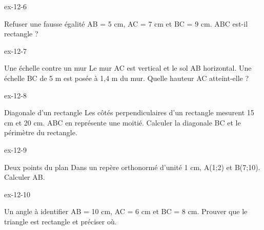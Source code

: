 \clearpage{}
\begin{blocLivre}{ex-12-6}\begin{exercice}[2]{Refuser une fausse égalité}
AB = 5 cm, AC = 7 cm et BC = 9 cm. ABC est-il rectangle ?
\label{fig-ex-12-6}
\end{exercice}\end{blocLivre}
\begin{blocLivre}{ex-12-7}\begin{exercice}[2]{Une échelle contre un mur}
Le mur AC est vertical et le sol AB horizontal. Une échelle BC de 5 m est posée à 1,4 m du mur. Quelle hauteur AC atteint-elle ?
\label{fig-ex-12-7}
\end{exercice}\end{blocLivre}
\begin{blocLivre}{ex-12-8}\begin{exercice}[2]{Diagonale d’un rectangle}
Les côtés perpendiculaires d’un rectangle mesurent 15 cm et 20 cm. ABC en représente une moitié. Calculer la diagonale BC et le périmètre du rectangle.
\label{fig-ex-12-8}
\end{exercice}\end{blocLivre}
\begin{blocLivre}{ex-12-9}\begin{exercice}[2]{Deux points du plan}
Dans un repère orthonormé d’unité 1 cm, A(1;2) et B(7;10). Calculer AB.
\label{fig-ex-12-9}
\end{exercice}\end{blocLivre}
\begin{blocLivre}{ex-12-10}\begin{exercice}[2]{Un angle à identifier}
AB = 10 cm, AC = 6 cm et BC = 8 cm. Prouver que le triangle est rectangle et préciser où.
\label{fig-ex-12-10}
\end{exercice}\end{blocLivre}

